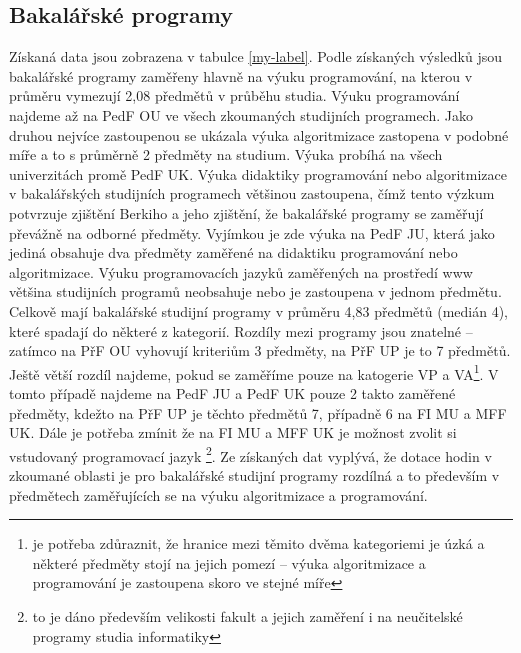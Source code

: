 \documentclass[FP,DP]{tulthesis}
\begin{document}
{{{{{{{\subsection{Bakalářské programy}
Získaná data jsou zobrazena v tabulce \ref{my-label}. Podle získaných výsledků jsou bakalářské programy zaměřeny hlavně na výuku programování, na kterou v průměru vymezují 2,08 předmětů v průběhu studia. Výuku programování najdeme až na PedF OU ve všech zkoumaných studijních programech. Jako druhou nejvíce zastoupenou se ukázala výuka algoritmizace zastopena v podobné míře a to s průměrně 2 předměty na studium. Výuka probíhá na všech univerzitách promě PedF UK. Výuka didaktiky programování nebo algoritmizace v bakalářských studijních programech většinou zastoupena, čímž tento výzkum potvrzuje zjištění Berkiho a jeho zjištění, že bakalářské programy se zaměřují převážně na odborné předměty. Vyjímkou je zde výuka na PedF JU, která jako jediná obsahuje dva předměty zaměřené na didaktiku programování nebo algoritmizace. Výuku programovacích jazyků zaměřených na prostředí www většina studijních programů neobsahuje nebo je zastoupena v jednom předmětu. 
Celkově mají bakalářské studijní programy v průměru 4,83 předmětů (medián 4), které spadají do některé z kategorií. Rozdíly mezi programy jsou znatelné --  zatímco na PřF OU vyhovují kriteriům 3 předměty, na PřF UP je to 7 předmětů. Ještě větší rozdíl najdeme, pokud se zaměříme pouze na katogerie VP a VA\footnote{je potřeba zdůraznit, že hranice mezi těmito dvěma kategoriemi je úzká a některé předměty stojí na jejich pomezí -- výuka algoritmizace a programování je zastoupena skoro ve stejné míře}. V tomto případě najdeme  na PedF JU a PedF UK  pouze 2 takto zaměřené předměty, kdežto na PřF UP je těchto předmětů 7, případně 6 na FI MU a MFF UK. Dále je potřeba zmínit že na FI MU a MFF UK je možnost zvolit si vstudovaný programovací jazyk \footnote{to je dáno především velikosti fakult a jejich zaměření i na neučitelské programy studia informatiky}.  Ze získaných dat vyplývá, že dotace hodin  v zkoumané oblasti je pro bakalářské studijní programy rozdílná a to především v předmětech zaměřujících se na výuku algoritmizace a programování.







}}}}}}}
\end{document}
